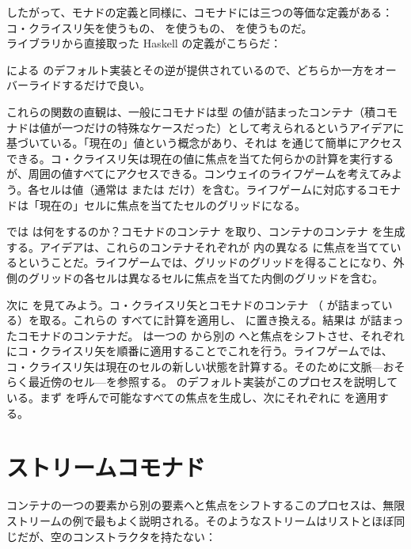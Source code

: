 したがって、モナドの定義と同様に、コモナドには三つの等価な定義がある：コ・クライスリ矢を使うもの、 を使うもの、 を使うものだ。\\  ライブラリから直接取った Haskell の定義がこちらだ：

 による  のデフォルト実装とその逆が提供されているので、どちらか一方をオーバーライドするだけで良い。

これらの関数の直観は、一般にコモナドは型  の値が詰まったコンテナ（積コモナドは値が一つだけの特殊なケースだった）として考えられるというアイデアに基づいている。「現在の」値という概念があり、それは  を通じて簡単にアクセスできる。コ・クライスリ矢は現在の値に焦点を当てた何らかの計算を実行するが、周囲の値すべてにアクセスできる。コンウェイのライフゲームを考えてみよう。各セルは値（通常は  または  だけ）を含む。ライフゲームに対応するコモナドは「現在の」セルに焦点を当てたセルのグリッドになる。

では  は何をするのか？コモナドのコンテナ  を取り、コンテナのコンテナ  を生成する。アイデアは、これらのコンテナそれぞれが  内の異なる  に焦点を当てているということだ。ライフゲームでは、グリッドのグリッドを得ることになり、外側のグリッドの各セルは異なるセルに焦点を当てた内側のグリッドを含む。

次に  を見てみよう。コ・クライスリ矢とコモナドのコンテナ （ が詰まっている）を取る。これらの  すべてに計算を適用し、 に置き換える。結果は  が詰まったコモナドのコンテナだ。 は一つの  から別の  へと焦点をシフトさせ、それぞれにコ・クライスリ矢を順番に適用することでこれを行う。ライフゲームでは、コ・クライスリ矢は現在のセルの新しい状態を計算する。そのために文脈---おそらく最近傍のセル---を参照する。 のデフォルト実装がこのプロセスを説明している。まず  を呼んで可能なすべての焦点を生成し、次にそれぞれに  を適用する。

\section{ストリームコモナド}

コンテナの一つの要素から別の要素へと焦点をシフトするこのプロセスは、無限ストリームの例で最もよく説明される。そのようなストリームはリストとほぼ同じだが、空のコンストラクタを持たない：

